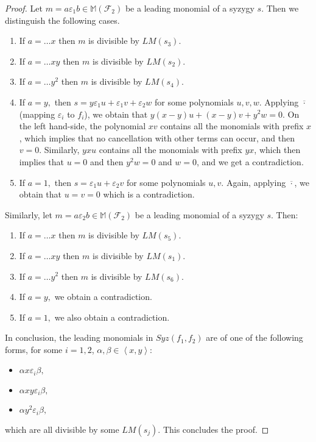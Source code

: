 \documentclass[sigconf]{acmart}
\theoremstyle{plain}
\theoremstyle{definition}
\theoremstyle{remark}
\newcommand{\MM}{\mathbb M}
\newcommand{\LM}{LM}
\begin{document}
\begin{proof}
Let $m=a \varepsilon_1 b \in \MM \left( \mathscr{F}_2 \right)$
be a leading monomial of a syzygy $s$.
Then we distinguish the following cases.
\begin{enumerate}
\item If $a = \dots x$ then $m$ is divisible by $\LM(s_3).$
\item If $a = \dots xy$ then $m$ is divisible by $\LM(s_2).$
\item If $a = \dots y^2$ then $m$ is divisible by $\LM(s_4).$
\item If $a = y,$ then $s = y \varepsilon_1 u+  \varepsilon_1 v + \varepsilon_2 w$ for some polynomials $u,v,w.$
Applying $\overline{\cdot}$ (mapping $\varepsilon_i$ to $f_i$), we 
obtain that $y (x-y) u+  (x-y) v + y^2 w=0.$
On the left hand-side, the polynomial $xv$ contains all the monomials
with prefix $x$, which implies 
that no cancellation with other terms can occur,
and then $v=0.$
Similarly, $yxu$ contains all the monomials
with prefix $yx$, which then implies that
$u=0$ and then $y^2 w=0$ and $w=0$, and we get
a contradiction.
\item If $a = 1,$ then $s = \varepsilon_1 u+  \varepsilon_2 v $ for some polynomials $u,v.$
Again, applying $\overline{\cdot}$, we 
obtain that $u=v=0$ which is a contradiction.
\end{enumerate}
Similarly, let $m=a \varepsilon_2 b \in \MM \left( \mathscr{F}_2 \right)$
be a leading monomial of a syzygy $s$. Then:
\begin{enumerate}
\item If $a = \dots x$ then $m$ is divisible by $\LM(s_5).$
\item If $a = \dots xy$ then $m$ is divisible by $\LM(s_1).$
\item If $a = \dots y^2$ then $m$ is divisible by $\LM(s_6).$
\item If $a = y,$ we obtain a contradiction.
\item If $a = 1,$ we also obtain a contradiction.
\end{enumerate}

In conclusion, the leading monomials in $Syz(f_1,f_2)$
are of one of the following forms, for some $i=1,2$, $\alpha, \beta \in \left\langle x,y \right\rangle$:
\begin{itemize}
\item $\alpha x \varepsilon_i \beta,$
\item $\alpha xy \varepsilon_i \beta,$
\item $\alpha y^2 \varepsilon_i \beta,$
\end{itemize}
which are all divisible by some $\LM(s_j).$
This concludes the proof.
\end{proof}
\end{document}

